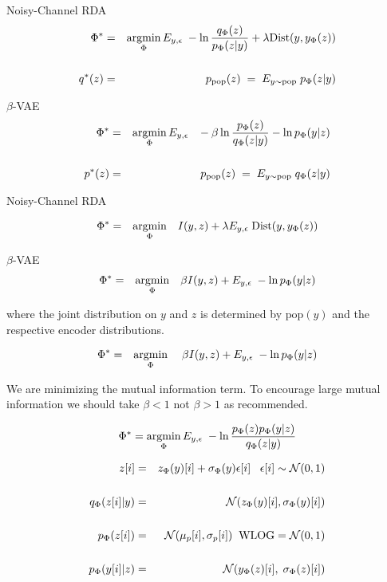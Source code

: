 {Noisy-Channel RDA
\begin{eqnarray*}
\Phi^* & = & \operatorname*{argmin}_\Phi E_{y,\epsilon}\;-\ln \frac{q_\Phi(z)}{p_\Phi(z|y)} + \lambda \mathrm{Dist}(y, y_\Phi(z)) \\
\\
q^*(z) & = & p_{\mathrm{pop}}(z) \;=\;E_{y \sim \mathrm{pop}}\;p_\Phi(z|y)
\end{eqnarray*}

\vfill
$\beta$-VAE
\begin{eqnarray*}
\Phi^* & = & \operatorname*{argmin}_\Phi E_{y,\epsilon}\;\;\;-\beta \ln \frac{p_\Phi(z)}{q_\Phi(z|y)} - \ln p_\Phi(y|z) \\
\\
p^*(z) & = & p_{\mathrm{pop}}(z) \;=\; E_{y \sim \mathrm{pop}}\;q_\Phi(z|y)
\end{eqnarray*}


Noisy-Channel RDA

\begin{eqnarray*}
\Phi^* & = & \operatorname*{argmin}_\Phi \;\;\; I(y,z) + \lambda E_{y,\epsilon}\; \mathrm{Dist}(y, y_\Phi(z))
\end{eqnarray*}

\vfill
$\beta$-VAE
\begin{eqnarray*}
\Phi^* & = & \operatorname*{argmin}_\Phi \;\;\; \beta I(y,z) + E_{y,\epsilon}\;-\ln p_\Phi(y|z)
\end{eqnarray*}

\vfill
where the joint distribution on $y$ and $z$ is determined by $\mathrm{pop}(y)$ and the respective encoder distributions.


\begin{eqnarray*}
\Phi^* & = & \operatorname*{argmin}_\Phi \;\;\;\;\beta I(y,z) +  E_{y,\epsilon}\;-\ln p_\Phi(y|z)
\end{eqnarray*}

\vfill
We are minimizing the mutual information term.  To encourage large mutual information we should take $\beta < 1$ not $\beta > 1$ as recommended.

$$\Phi^* = \operatorname*{argmin}_\Phi E_{y,\epsilon}\;-\ln \frac{p_\Phi(z)p_\Phi(y|z)}{q_\Phi(z|y)}$$

{\color{red}
\begin{eqnarray*}
z[i] & = & z_\Phi(y)[i] + \sigma_\Phi(y)\epsilon[i]\;\;\;\epsilon[i] \sim {\cal N}(0,1) \\
\\
q_\Phi(z[i]|y) & = & {\cal N}(z_\Phi(y)[i],\sigma_\Phi(y)[i]) \\
\\
p_\Phi(z[i]) & = & {\cal N}(\mu_p[i],\sigma_p[i]) \;\;\mbox{WLOG} = {\cal N}(0,1) \\
\\
p_\Phi(y[i]|z) & = & {\cal N}(y_\Phi(z)[i],\;\sigma_\Phi(z)[i])
\end{eqnarray*}
}

}
